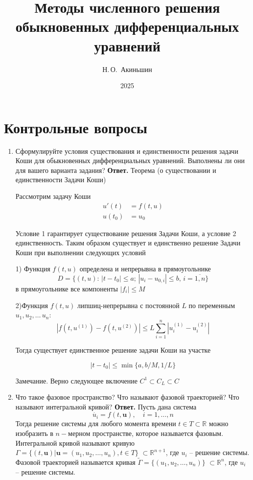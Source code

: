 \documentclass{article}
\title{Методы численного решения обыкновенных
дифференциальных уравнений}
\author{Н.\,О.~Акиньшин}
\date{2025}
\begin{document}
    \maketitle
    \newpage
    \tableofcontents
    \newpage

    \section{Контрольные вопросы}
    \begin{enumerate}
        \item Сформулируйте условия существования и единственности
        решения задачи Коши для обыкновенных дифференциальных уравнений. Выполнены ли они для вашего варианта
        задания?
        \newline
        {\bfseries Ответ. } 
        \noindent Теорема (о существовании и единственности Задачи Коши)
	
	
	Рассмотрим задачу Коши
	\begin{equation}
		\begin{split}
			u'(t)&=f(t,u) \\
			u(t_0)&=u_0
		\end{split}
	\end{equation}
	
	Условие 1 гарантирует существование решения Задачи Коши, а условие 2 единственность. Таким образом существует и единственно решение Задачи Коши при выполнении следующих условий
	
	
	1) Функция $f(t,u)$ определена и непрерывна в прямоугольнике \[D=\{(t, u):\, |t-t_0| \le a; \,|u_i-u_{0,i}| \le b, \, i =\overline{1,n}\}\]
	в прямоугольнике все компоненты $|f_i| \le M$
	
	2)Функция $f(t,u)$ липшиц-непрерывна с постоянной $L$ по переменным $u_1,u_2,\ldots \, u_n$:
	\[
	|f(t, u^{(1)}) - f(t, u^{(2)})| \le L \sum_{i=1}^{n}|u_i^{(1)}-u_i^{(2)}|
	\]
	
	Тогда существует единственное решение задачи Коши на участке 
	
	\[
	|t-t_0|\le \min\{a,b/M,1/L\} 
	\]
	
	
	Замечание. Верно следующее включение $C^1 \subset C_L \subset C$
        \item Что такое фазовое пространство? Что называют фазовой
        траекторией? Что называют интегральной кривой?
        \newline
        {\bfseries Ответ. } 
        Пусть дана система 
        \begin{equation*}
            \dot{u_i} = f(t, \mathbf{u}), \quad i = 1,\ldots, n
        \end{equation*}
        Тогда решение системы  для любого момента 
        времени $t \in T\subset \mathbb{R}$ можно изобразить в $n-$мерном пространстве, которое 
        называется фазовым. 
        Интегральной кривой называют кривую $\Gamma = \{(t, \mathbf{u}) | \mathbf{u} =
         (u_1, u_2, \ldots, u_n), t \in T\}$ $\subset \mathbb{R}^{n+1}$, где $u_i$ -- решение системы.
        Фазовой траекторией называется кривая $\tilde{\Gamma} = \{(u_1, u_2, \ldots, u_n)\}$ $\subset \mathbb{R}^{n}$, где $u_i$ -- решение системы.
        

\end{enumerate}
\end{document}
